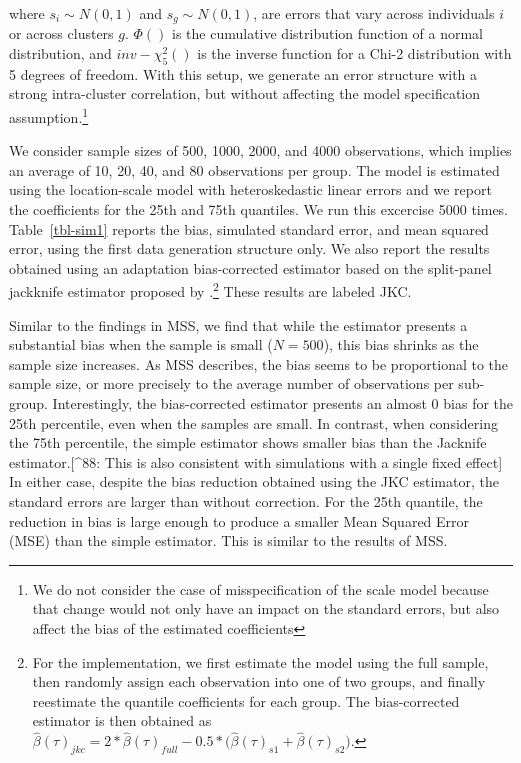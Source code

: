 \documentclass[
  authoryear,
  review,
  1p]{elsarticle}
\begin{document}
where \(s_{i}\sim N(0,1)\) and \(s_{g}\sim N(0,1)\), are errors that
vary across individuals \(i\) or across clusters \(g\). \(\Phi()\) is
the cumulative distribution function of a normal distribution, and
\(inv-\chi^2_5()\) is the inverse function for a Chi-2 distribution with
5 degrees of freedom. With this setup, we generate an error structure
with a strong intra-cluster correlation, but without affecting the model
specification assumption.\footnote{We do not consider the case of
  misspecification of the scale model because that change would not only
  have an impact on the standard errors, but also affect the bias of the
  estimated coefficients}

We consider sample sizes of 500, 1000, 2000, and 4000 observations,
which implies an average of 10, 20, 40, and 80 observations per group.
The model is estimated using the location-scale model with
heteroskedastic linear errors and we report the coefficients for the
25th and 75th quantiles. We run this excercise 5000 times.
Table~\ref{tbl-sim1} reports the bias, simulated standard error, and
mean squared error, using the first data generation structure only. We
also report the results obtained using an adaptation bias-corrected
estimator based on the split-panel jackknife estimator proposed by
\citet{dhaene2015}.\footnote{For the implementation, we first estimate
  the model using the full sample, then randomly assign each observation
  into one of two groups, and finally reestimate the quantile
  coefficients for each group. The bias-corrected estimator is then
  obtained as
  \(\hat\beta(\tau)_{jkc}=2*\hat\beta(\tau)_{full}-0.5*\big(\hat\beta(\tau)_{s1}+\hat\beta(\tau)_{s2}\big)\).}
These results are labeled JKC.

Similar to the findings in MSS, we find that while the estimator
presents a substantial bias when the sample is small (\(N=500\)), this
bias shrinks as the sample size increases. As MSS describes, the bias
seems to be proportional to the sample size, or more precisely to the
average number of observations per sub-group. Interestingly, the
bias-corrected estimator presents an almost 0 bias for the 25th
percentile, even when the samples are small. In contrast, when
considering the 75th percentile, the simple estimator shows smaller bias
than the Jacknife estimator.{[}\^{}88: This is also consistent with
simulations with a single fixed effect{]} In either case, despite the
bias reduction obtained using the JKC estimator, the standard errors are
larger than without correction. For the 25th quantile, the reduction in
bias is large enough to produce a smaller Mean Squared Error (MSE) than
the simple estimator. This is similar to the results of MSS.
\end{document}
